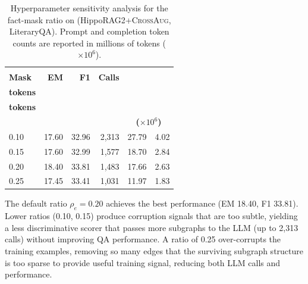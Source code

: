 \documentclass[11pt]{article}
\newcommand{\ours}{\textsc{CrossAug}\xspace}
\begin{document}
\begin{table}[!htbp]
\centering
\footnotesize
\setlength{\tabcolsep}{3pt}
\begin{tabular*}{\columnwidth}{@{\extracolsep{\fill}}lrrrrr@{}}
\toprule
\begin{tabular}[c]{@{}c@{}}\textbf{Fact}\\\textbf{Mask}\end{tabular} &
\textbf{EM} & \textbf{F1} & \textbf{Calls} &
\begin{tabular}[c]{@{}c@{}}\textbf{Prompt}\\\textbf{tokens}\end{tabular} &
\begin{tabular}[c]{@{}c@{}}\textbf{Completion}\\\textbf{tokens}\end{tabular} \\
 & & & & \multicolumn{2}{c}{\textbf{($\times 10^6$)}} \\
\midrule
0.10 & 17.60 & 32.96 & 2,313 & 27.79 & 4.02 \\
0.15 & 17.60 & 32.99 & 1,577 & 18.70 & 2.84 \\
0.20 & 18.40 & 33.81 & 1,483 & 17.66 & 2.63 \\
0.25 & 17.45 & 33.41 & 1,031 & 11.97 & 1.83 \\
\bottomrule
\end{tabular*}
\caption{Hyperparameter sensitivity analysis for the fact-mask ratio on (HippoRAG2+\ours, LiteraryQA). Prompt and completion token counts are reported in millions of tokens ($\times 10^6$).}
\label{tab:fact-mask-sensitivity}
\end{table}

The default ratio $\rho_e{=}0.20$ achieves the best performance (EM 18.40, F1 33.81). Lower ratios (0.10, 0.15) produce corruption signals that are too subtle, yielding a less discriminative scorer that passes more subgraphs to the LLM (up to 2,313 calls) without improving QA performance. A ratio of 0.25 over-corrupts the training examples, removing so many edges that the surviving subgraph structure is too sparse to provide useful training signal, reducing both LLM calls and performance.
\end{document}
